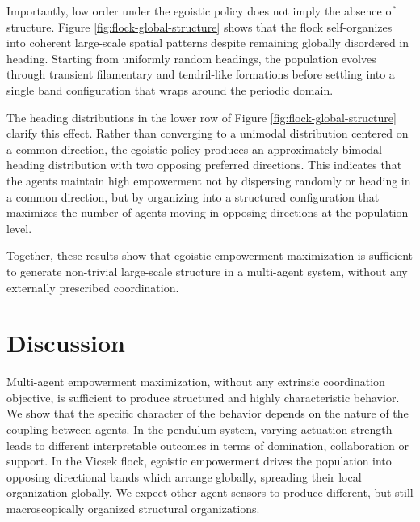 \documentclass{article} %
\begin{document}
Importantly, low order under the egoistic policy does not imply the absence of structure. Figure \ref{fig:flock-global-structure} shows that the flock self-organizes into coherent large-scale spatial patterns despite remaining globally disordered in heading. Starting from uniformly random headings, the population evolves through transient filamentary and tendril-like formations before settling into a single band configuration that wraps around the periodic domain.

The heading distributions in the lower row of Figure \ref{fig:flock-global-structure} clarify this effect. Rather than converging to a unimodal distribution centered on a common direction, the egoistic policy produces an approximately bimodal heading distribution with two opposing preferred directions. This indicates that the agents maintain high empowerment not by dispersing randomly or heading in a common direction, but by organizing into a structured configuration that maximizes the number of agents moving in opposing directions at the population level.

Together, these results show that egoistic empowerment maximization is sufficient to generate non-trivial large-scale structure in a multi-agent system, without any externally prescribed coordination.


\section{Discussion}

Multi-agent empowerment maximization, without any extrinsic
coordination objective, is sufficient to produce structured and highly
characteristic 
behavior. We show that the specific character of the behavior depends
on the nature of the coupling between agents. In the pendulum system,
varying actuation strength leads to different interpretable outcomes
in terms of domination, collaboration or support. In the Vicsek flock,
egoistic empowerment drives the population into opposing directional
bands which arrange globally, spreading their local organization
globally. We expect other agent sensors to produce different, but
still macroscopically organized structural organizations.
\end{document}
